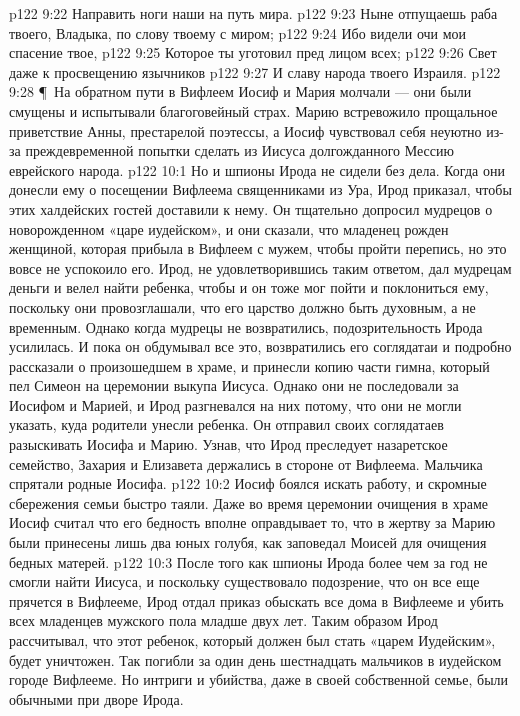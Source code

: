 \vs p122 9:22 Направить ноги наши на путь мира.
\vs p122 9:23 Ныне отпущаешь раба твоего, Владыка, по слову твоему с миром;
\vs p122 9:24 Ибо видели очи мои спасение твое,
\vs p122 9:25 Которое ты уготовил пред лицом всех;
\vs p122 9:26 Свет даже к просвещению язычников
\vs p122 9:27 И славу народа твоего Израиля.
\vs p122 9:28 \P\ На обратном пути в Вифлеем Иосиф и Мария молчали --- они были смущены и испытывали благоговейный страх. Марию встревожило прощальное приветствие Анны, престарелой поэтессы, а Иосиф чувствовал себя неуютно из\hyp{}за преждевременной попытки сделать из Иисуса долгожданного Мессию еврейского народа.
\vs p122 10:1 Но и шпионы Ирода не сидели без дела. Когда они донесли ему о посещении Вифлеема священниками из Ура, Ирод приказал, чтобы этих халдейских гостей доставили к нему. Он тщательно допросил мудрецов о новорожденном «царе иудейском», и они сказали, что младенец рожден женщиной, которая прибыла в Вифлеем с мужем, чтобы пройти перепись, но это вовсе не успокоило его. Ирод, не удовлетворившись таким ответом, дал мудрецам деньги и велел найти ребенка, чтобы и он тоже мог пойти и поклониться ему, поскольку они провозглашали, что его царство должно быть духовным, а не временным. Однако когда мудрецы не возвратились, подозрительность Ирода усилилась. И пока он обдумывал все это, возвратились его соглядатаи и подробно рассказали о произошедшем в храме, и принесли копию части гимна, который пел Симеон на церемонии выкупа Иисуса. Однако они не последовали за Иосифом и Марией, и Ирод разгневался на них потому, что они не могли указать, куда родители унесли ребенка. Он отправил своих соглядатаев разыскивать Иосифа и Марию. Узнав, что Ирод преследует назаретское семейство, Захария и Елизавета держались в стороне от Вифлеема. Мальчика спрятали родные Иосифа.
\vs p122 10:2 Иосиф боялся искать работу, и скромные сбережения семьи быстро таяли. Даже во время церемонии очищения в храме Иосиф считал что его бедность вполне оправдывает то, что в жертву за Марию были принесены лишь два юных голубя, как заповедал Моисей для очищения бедных матерей.
\vs p122 10:3 После того как шпионы Ирода более чем за год не смогли найти Иисуса, и поскольку существовало подозрение, что он все еще прячется в Вифлееме, Ирод отдал приказ обыскать все дома в Вифлееме и убить всех младенцев мужского пола младше двух лет. Таким образом Ирод рассчитывал, что этот ребенок, который должен был стать «царем Иудейским», будет уничтожен. Так погибли за один день шестнадцать мальчиков в иудейском городе Вифлееме. Но интриги и убийства, даже в своей собственной семье, были обычными при дворе Ирода.
